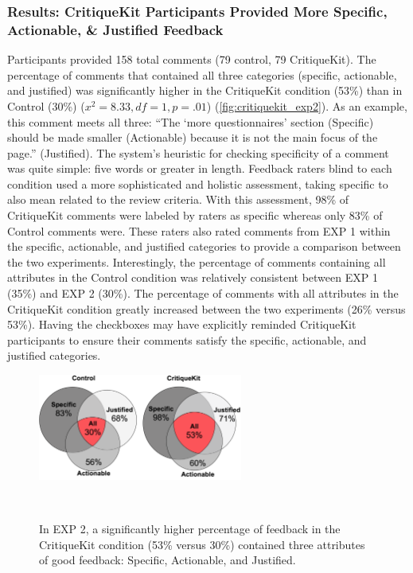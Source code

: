 \subsubsection{Results: CritiqueKit Participants Provided More Specific, Actionable, \& Justified Feedback}
Participants provided 158 total comments (79 control, 79 CritiqueKit). The percentage of comments that contained all three categories (specific, actionable, and justified) was significantly higher in the CritiqueKit condition (53\%) than in Control (30\%) ($x^2=8.33, df = 1, p = .01$) (\autoref{fig:critiquekit_exp2}). As an example, this comment meets all three: ``The `more questionnaires' section (Specific) should be made smaller (Actionable) because it is not the main focus of the page.'' (Justified). The system's heuristic for checking specificity of a comment was quite simple: five words or greater in length. Feedback raters blind to each condition used a more sophisticated and holistic assessment, taking specific to also mean related to the review criteria. With this assessment, 98\% of CritiqueKit comments were labeled by raters as specific whereas only 83\% of Control comments were. These raters also rated comments from EXP 1 within the specific, actionable, and justified categories to provide a comparison between the two experiments. Interestingly, the percentage of comments containing all attributes in the Control condition was relatively consistent between EXP 1 (35\%) and EXP 2 (30\%). The percentage of comments with all attributes in the CritiqueKit condition greatly increased between the two experiments (26\% versus 53\%). Having the checkboxes may have explicitly reminded CritiqueKit participants to ensure their comments satisfy the specific, actionable, and justified categories.

\begin{figure}[b!]
\centering
  \includegraphics[width=0.6\textwidth]{critiquekit/figures/venn_diagram_exp2.png}
  \caption{In EXP 2, a significantly higher percentage of feedback in the CritiqueKit condition (53\% versus 30\%) contained three attributes of good feedback: Specific, Actionable, and Justified.}~\label{fig:critiquekit_exp2}
\end{figure}

